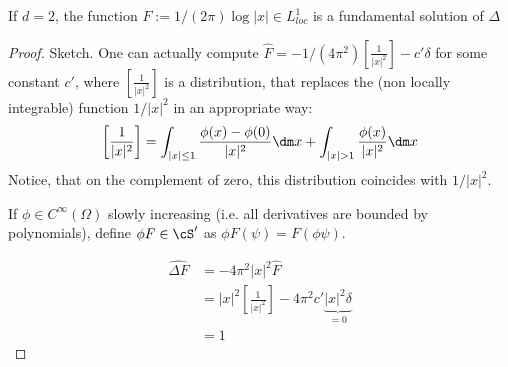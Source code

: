 	\begin{proposition}
		If $d = 2$, the function $F := 1/(2\pi) \log |x| \in L^1_{loc}$ is a fundamental solution of $\Delta$
	\end{proposition}
	\begin{proof} Sketch.
		One can actually compute $\hat F = -1 / (4\pi^2) \left [\frac{1}{|x|^2} \right] - c' \delta$ for some constant $c'$, where  $\left [\frac{1}{|x|^2} \right]$ is a distribution, that replaces the (non locally integrable) function $1  / |x|^2$ in an appropriate way:
		\[
		\left [\frac{1}{|x|^2} \right] = \int_{|x| \le 1} \frac{\phi(x) - \phi(0)}{|x|^2} \dm x + \int_{|x| > 1} \frac{\phi(x)}{|x|^2} \dm x
		\]
		Notice, that on the complement of zero, this distribution coincides with $1 / |x|^2$.
		\begin{notation}
			If $\phi \in C^\infty(\Omega)$ slowly increasing (i.e. all derivatives are bounded by polynomials), define $\phi F \in \cS'$ as $\phi F(\psi) = F(\phi \psi)$.
		\end{notation}
		\begin{align*}
			\widehat{ \Delta F} &= -4 \pi^2 |x|^2 \hat F\\
			&=  |x|^2 \left [\frac{1}{|x|^2} \right] - 4\pi^2 c' \underbrace{|x|^2 \delta}_{=0} \\
			&= 1
		\end{align*}
	\end{proof}
